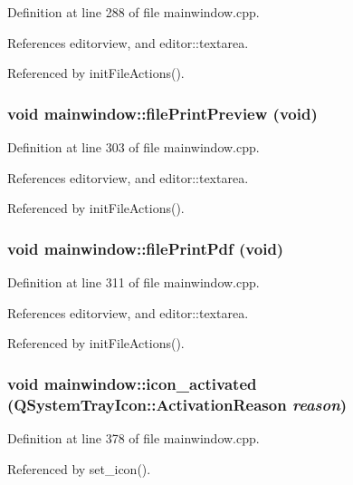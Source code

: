 Definition at line 288 of file mainwindow.cpp.

References editorview, and editor::textarea.

Referenced by init\-File\-Actions().
\subsubsection{\setlength{\rightskip}{0pt plus 5cm}void mainwindow::file\-Print\-Preview (void)\hspace{0.3cm}{\tt  [private, slot]}}\label{classmainwindow_388d5a83b09b316d9633546d26e15fb4}




Definition at line 303 of file mainwindow.cpp.

References editorview, and editor::textarea.

Referenced by init\-File\-Actions().
\subsubsection{\setlength{\rightskip}{0pt plus 5cm}void mainwindow::file\-Print\-Pdf (void)\hspace{0.3cm}{\tt  [private, slot]}}\label{classmainwindow_5f7a78c602919a7ca92aae56532b4ed5}




Definition at line 311 of file mainwindow.cpp.

References editorview, and editor::textarea.

Referenced by init\-File\-Actions().
\subsubsection{\setlength{\rightskip}{0pt plus 5cm}void mainwindow::icon\_\-activated (QSystem\-Tray\-Icon::Activation\-Reason {\em reason})\hspace{0.3cm}{\tt  [private, slot]}}\label{classmainwindow_3c050e01ff3cd4abda990c47807a6327}




Definition at line 378 of file mainwindow.cpp.

Referenced by set\_\-icon().
